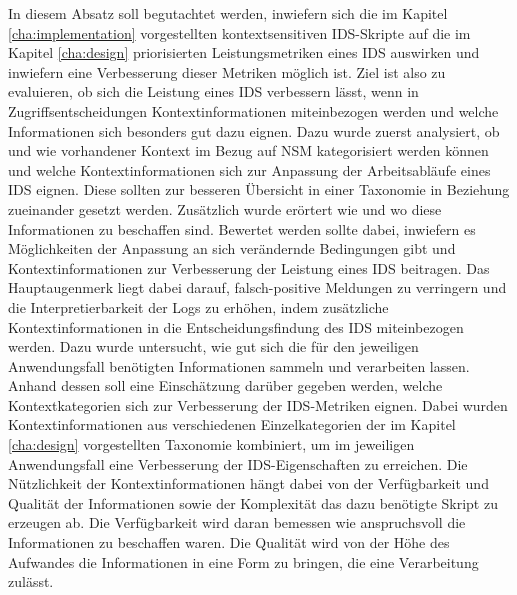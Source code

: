 In diesem Absatz soll begutachtet werden, inwiefern sich die im Kapitel \ref{cha:implementation} vorgestellten kontextsensitiven IDS-Skripte auf die im Kapitel \ref{cha:design} priorisierten Leistungsmetriken eines IDS auswirken und inwiefern eine Verbesserung dieser Metriken möglich ist. Ziel ist also zu evaluieren, ob sich die Leistung eines IDS verbessern lässt, wenn in Zugriffsentscheidungen Kontextinformationen miteinbezogen werden und welche Informationen sich besonders gut dazu eignen.
Dazu wurde zuerst analysiert, ob und wie vorhandener Kontext im Bezug auf NSM kategorisiert werden können und welche Kontextinformationen sich zur Anpassung der Arbeitsabläufe eines IDS eignen. Diese sollten zur besseren Übersicht in einer Taxonomie in Beziehung zueinander gesetzt werden. Zusätzlich wurde erörtert wie und wo diese Informationen zu beschaffen sind. Bewertet werden sollte dabei, inwiefern es Möglichkeiten der Anpassung an sich verändernde Bedingungen gibt und Kontextinformationen zur Verbesserung der Leistung eines IDS beitragen.
Das Hauptaugenmerk liegt dabei darauf, falsch-positive Meldungen zu verringern und die Interpretierbarkeit der Logs zu erhöhen, indem zusätzliche Kontextinformationen in die Entscheidungsfindung des IDS miteinbezogen werden. Dazu wurde untersucht, wie gut sich die für den jeweiligen Anwendungsfall benötigten Informationen sammeln und verarbeiten lassen. Anhand dessen soll eine Einschätzung darüber gegeben werden, welche Kontextkategorien sich zur Verbesserung der IDS-Metriken eignen.
Dabei wurden Kontextinformationen aus verschiedenen Einzelkategorien der im Kapitel \ref{cha:design} vorgestellten Taxonomie kombiniert, um im jeweiligen Anwendungsfall eine Verbesserung der IDS-Eigenschaften zu erreichen.
Die Nützlichkeit der Kontextinformationen hängt dabei von der Verfügbarkeit und Qualität der Informationen sowie der Komplexität das dazu benötigte Skript zu erzeugen ab. 
Die Verfügbarkeit wird daran bemessen wie anspruchsvoll die Informationen zu beschaffen waren. Die Qualität wird von der Höhe des Aufwandes die Informationen in eine Form zu bringen, die eine Verarbeitung zulässt.




